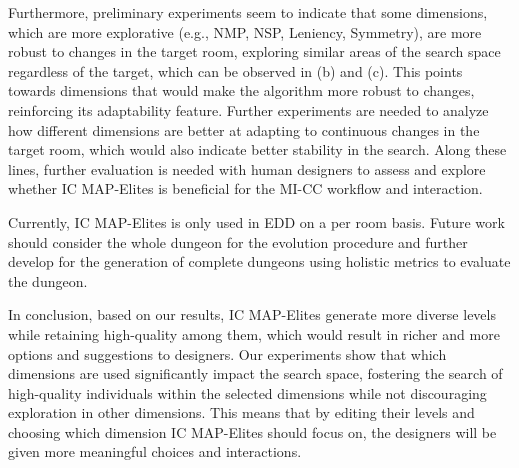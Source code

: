 Furthermore, preliminary experiments seem to indicate that some dimensions, which are more explorative (e.g., NMP, NSP, Leniency, Symmetry), are more robust to changes in the target room, exploring similar areas of the search space regardless of the target, which can be observed in  (b) and (c). This points towards dimensions that would make the algorithm more robust to changes, reinforcing its adaptability feature. Further experiments are needed to analyze how different dimensions are better at adapting to continuous changes in the target room, which would also indicate better stability in the search. Along these lines, further evaluation is needed with human designers to assess and explore whether IC MAP-Elites is beneficial for the MI-CC workflow and interaction. 


Currently, IC MAP-Elites is only used in EDD on a per room basis. Future work should consider the whole dungeon for the evolution procedure and further develop for the generation of complete dungeons using holistic metrics to evaluate the dungeon.


In conclusion, based on our results, IC MAP-Elites generate more diverse levels while retaining high-quality among them, which would result in richer and more options and suggestions to designers. Our experiments show that which dimensions are used significantly impact the search space, fostering the search of high-quality individuals within the selected dimensions while not discouraging exploration in other dimensions. This means that by editing their levels and choosing which dimension IC MAP-Elites should focus on, the designers will be given more meaningful choices and interactions.


